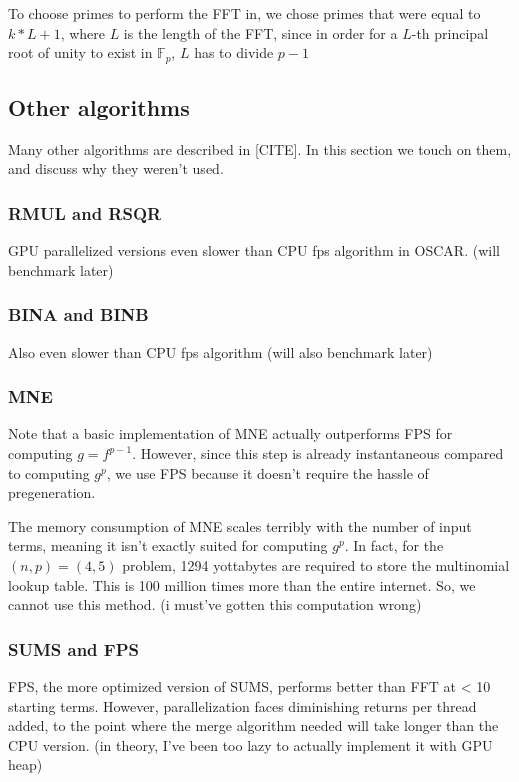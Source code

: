 To choose primes to perform the FFT in, we chose primes that were equal to $k * L + 1$, where $L$ is the length of the FFT, since in order for a $L$-th principal root of unity to exist in $\mathbb{F}_p$, $L$ has to divide $p - 1$

\subsection{Other algorithms}
Many other algorithms are described in [CITE]. In this section we touch on them, and discuss why they
weren't used.

\subsubsection{RMUL and RSQR}
GPU parallelized versions even slower than CPU fps algorithm in OSCAR. (will benchmark later)

\subsubsection{BINA and BINB}
Also even slower than CPU fps algorithm (will also benchmark later)

\subsubsection{MNE}
Note that a basic implementation of MNE actually outperforms FPS for computing $g = f^{p - 1}$. However, 
since this step is already instantaneous compared to computing $g ^ p$, we use FPS because it doesn't require 
the hassle of pregeneration.

The memory consumption of MNE scales terribly with the number of input terms, meaning it isn't exactly suited for computing $g ^ p$. In fact, for the $(n, p) = (4, 5)$ problem, 1294 yottabytes are required to store the multinomial lookup table. This is 100 million times more than the entire internet. So, we cannot use this method. (i must've gotten this computation wrong)


\subsubsection{SUMS and FPS}
FPS, the more optimized version of SUMS, performs better than FFT at < 10 starting terms. However,
parallelization faces diminishing returns per thread added, to the point where the merge algorithm needed
will take longer than the CPU version. (in theory, I've been too lazy to actually implement it with GPU 
heap)